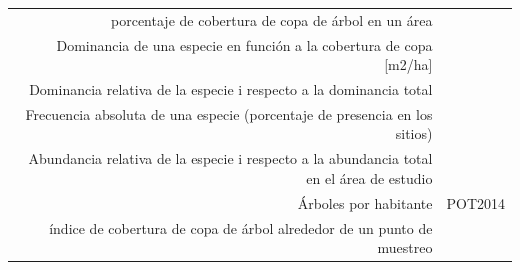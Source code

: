 \documentclass[12pt,]{book}
\begin{document}
\begin{longtable}[]{@{}rr@{}}
\begin{minipage}[t]{0.57\columnwidth}
porcentaje de cobertura de copa de árbol en un área\strut
\end{minipage} & \begin{minipage}[t]{0.31\columnwidth}\raggedleft\strut
\citep{nowak_sustaining_2010}\strut
\end{minipage}\tabularnewline
\begin{minipage}[t]{0.57\columnwidth}\raggedleft\strut
Dominancia de una especie en función a la cobertura de copa
{[}m2/ha{]}\strut
\end{minipage} & \begin{minipage}[t]{0.31\columnwidth}\raggedleft\strut
\citep{alanis_estructura_2014}\strut
\end{minipage}\tabularnewline
\begin{minipage}[t]{0.57\columnwidth}\raggedleft\strut
Dominancia relativa de la especie i respecto a la dominancia total\strut
\end{minipage} & \begin{minipage}[t]{0.31\columnwidth}\raggedleft\strut
\citep{alanis_estructura_2014}\strut
\end{minipage}\tabularnewline
\begin{minipage}[t]{0.57\columnwidth}\raggedleft\strut
Frecuencia absoluta de una especie (porcentaje de presencia en los
sitios)\strut
\end{minipage} & \begin{minipage}[t]{0.31\columnwidth}\raggedleft\strut
\citep{alanis_estructura_2014}\strut
\end{minipage}\tabularnewline
\begin{minipage}[t]{0.57\columnwidth}\raggedleft\strut
Abundancia relativa de la especie i respecto a la abundancia total en el
área de estudio\strut
\end{minipage} & \begin{minipage}[t]{0.31\columnwidth}\raggedleft\strut
\citep{alanis_estructura_2014}\strut
\end{minipage}\tabularnewline
\begin{minipage}[t]{0.57\columnwidth}\raggedleft\strut
Árboles por habitante\strut
\end{minipage} & \begin{minipage}[t]{0.31\columnwidth}\raggedleft\strut
POT2014\strut
\end{minipage}\tabularnewline
\begin{minipage}[t]{0.57\columnwidth}\raggedleft\strut
índice de cobertura de copa de árbol alrededor de un punto de
muestreo\strut
\end{minipage} & \begin{minipage}[t]{0.31\columnwidth}\raggedleft\strut

\end{minipage}
\end{longtable}
\end{document}
